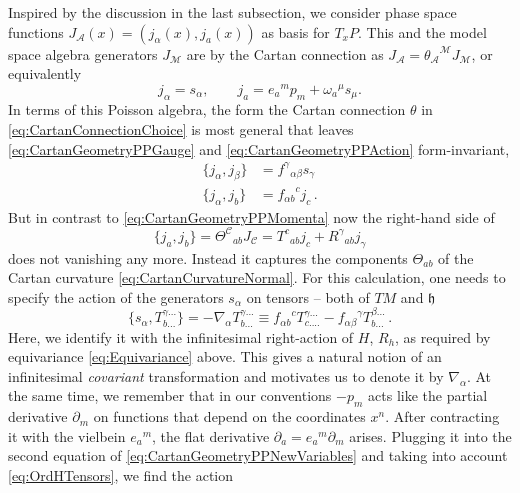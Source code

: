 \documentclass[11pt,a4paper]{article}
\numberwithin{equation}{section}
\begin{document}
Inspired by the discussion in the last subsection, we consider phase space functions $J_{\mathcal{A}}(x) = (j_\alpha(x) , j_a(x))$ as basis for $T_x P$. This and the model space algebra generators $J_{\mathcal{M}}$ are by the Cartan connection as $J_{\mathcal{A}} = {\theta_{\mathcal{A}}}^{\mathcal{M}} J_{\mathcal{M}}$, or equivalently
\begin{equation}
    j_\alpha = s_\alpha, \qquad j_a = {e_a}^m p_m + {\omega_a}^\mu s_\mu. \label{eq:CartanGeometryPPNewVariables}
\end{equation}
In terms of this Poisson algebra, the form the Cartan connection $\theta$ in \eqref{eq:CartanConnectionChoice} is most general that leaves \eqref{eq:CartanGeometryPPGauge} and \eqref{eq:CartanGeometryPPAction} form-invariant,
\begin{align}
    \{ j_\alpha , j_\beta \} &= {f^\gamma}_{\alpha \beta} s_\gamma \\
    \{ j_\alpha , j_b \} &= {f_{\alpha b}}^c j_c\,.
\end{align}
But in contrast to \eqref{eq:CartanGeometryPPMomenta} now the right-hand side of
\begin{equation}
    \{ j_a , j_b \} = {\Theta^{\mathcal{C}}}_{ab} J_{\mathcal{C}} = {T^c}_{ab} j_c + {R^\gamma}_{ab} j_\gamma \label{eq:CartanGeometryOrdCURRENTALGEBRA}
\end{equation}
does not vanishing any more. Instead it captures the components $\Theta_{ab}$ of the Cartan curvature \eqref{eq:CartanCurvatureNormal}. For this calculation, one needs to specify the action of the generators $s_\alpha$ on tensors -- both of $TM$ and $\mathfrak{h}$
\begin{equation}
\{ s_\alpha , T_{b ...}^{\gamma ...} \} = - \nabla_\alpha T_{b ...}^{\gamma ...} \equiv {f_{\alpha b}}^c T_{c ....}^{\gamma ...} - {f_{\alpha \beta}}^\gamma T_{b ...}^{\beta ...}\,. \label{eq:OrdHTensors} 
\end{equation}
Here, we identify it with the infinitesimal right-action of $H$, $R_h$, as required by equivariance \eqref{eq:Equivariance} above. This gives a natural notion of an infinitesimal \textit{covariant} transformation and motivates us to denote it by $\nabla_\alpha$. At the same time, we remember that in our conventions $-p_m$ acts like the partial derivative $\partial_m$ on functions that depend on the coordinates $x^n$. After contracting it with the vielbein $e_a{}^m$, the flat derivative $\partial_a = e_a{}^m \partial_m$ arises. Plugging it into the second equation of \eqref{eq:CartanGeometryPPNewVariables} and taking into account \eqref{eq:OrdHTensors}, we find the action 
\end{document}
